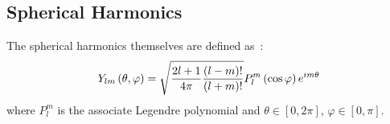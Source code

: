 \subsection{Spherical Harmonics}\label{sec:spherical-harmonics}
The spherical harmonics themselves are defined as~\cite{bellNuclearReactorTheory1970}:
\begin{equation}
  Y_{lm}\left(\theta,\varphi\right)=\sqrt{\frac{2l+1}{4\pi}\frac{(l-m)!}{(l+m)!}}P_l^m\left(\cos\varphi\right)e^{im\theta}
\end{equation}
where $P_l^m$ is the associate Legendre polynomial and $\theta\in [0,2\pi]$, $\varphi\in [0,\pi]$.